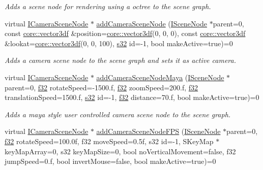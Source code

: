 \begin{DoxyCompactItemize}
\begin{DoxyCompactList}\small\item\em Adds a scene node for rendering using a octree to the scene graph. \end{DoxyCompactList}\item 
virtual \hyperlink{classirr_1_1scene_1_1ICameraSceneNode}{I\+Camera\+Scene\+Node} $\ast$ \hyperlink{classirr_1_1scene_1_1ISceneManager_afc3733849319078d5d22d94f58c7d1f2}{add\+Camera\+Scene\+Node} (\hyperlink{classirr_1_1scene_1_1ISceneNode}{I\+Scene\+Node} $\ast$parent=0, const \hyperlink{namespaceirr_1_1core_ae6e2b2a6c552833ebbd5b7463d03586b}{core\+::vector3df} \&position=\hyperlink{namespaceirr_1_1core_ae6e2b2a6c552833ebbd5b7463d03586b}{core\+::vector3df}(0, 0, 0), const \hyperlink{namespaceirr_1_1core_ae6e2b2a6c552833ebbd5b7463d03586b}{core\+::vector3df} \&lookat=\hyperlink{namespaceirr_1_1core_ae6e2b2a6c552833ebbd5b7463d03586b}{core\+::vector3df}(0, 0, 100), \hyperlink{namespaceirr_ac66849b7a6ed16e30ebede579f9b47c6}{s32} id=-\/1, bool make\+Active=true)=0
\begin{DoxyCompactList}\small\item\em Adds a camera scene node to the scene graph and sets it as active camera. \end{DoxyCompactList}\item 
virtual \hyperlink{classirr_1_1scene_1_1ICameraSceneNode}{I\+Camera\+Scene\+Node} $\ast$ \hyperlink{classirr_1_1scene_1_1ISceneManager_a18e81a59e02231567ac938ea287fe523}{add\+Camera\+Scene\+Node\+Maya} (\hyperlink{classirr_1_1scene_1_1ISceneNode}{I\+Scene\+Node} $\ast$parent=0, \hyperlink{namespaceirr_a0277be98d67dc26ff93b1a6a1d086b07}{f32} rotate\+Speed=-\/1500.f, \hyperlink{namespaceirr_a0277be98d67dc26ff93b1a6a1d086b07}{f32} zoom\+Speed=200.f, \hyperlink{namespaceirr_a0277be98d67dc26ff93b1a6a1d086b07}{f32} translation\+Speed=1500.f, \hyperlink{namespaceirr_ac66849b7a6ed16e30ebede579f9b47c6}{s32} id=-\/1, \hyperlink{namespaceirr_a0277be98d67dc26ff93b1a6a1d086b07}{f32} distance=70.f, bool make\+Active=true)=0
\begin{DoxyCompactList}\small\item\em Adds a maya style user controlled camera scene node to the scene graph. \end{DoxyCompactList}\item 
virtual \hyperlink{classirr_1_1scene_1_1ICameraSceneNode}{I\+Camera\+Scene\+Node} $\ast$ \hyperlink{classirr_1_1scene_1_1ISceneManager_ac312cbc85161678d00192880f2cdddbb}{add\+Camera\+Scene\+Node\+F\+PS} (\hyperlink{classirr_1_1scene_1_1ISceneNode}{I\+Scene\+Node} $\ast$parent=0, \hyperlink{namespaceirr_a0277be98d67dc26ff93b1a6a1d086b07}{f32} rotate\+Speed=100.\+0f, f32 move\+Speed=0.\+5f, s32 id=-\/1, S\+Key\+Map $\ast$key\+Map\+Array=0, s32 key\+Map\+Size=0, bool no\+Vertical\+Movement=false, f32 jump\+Speed=0.\+f, bool invert\+Mouse=false, bool make\+Active=true)=0

\end{DoxyCompactItemize}
